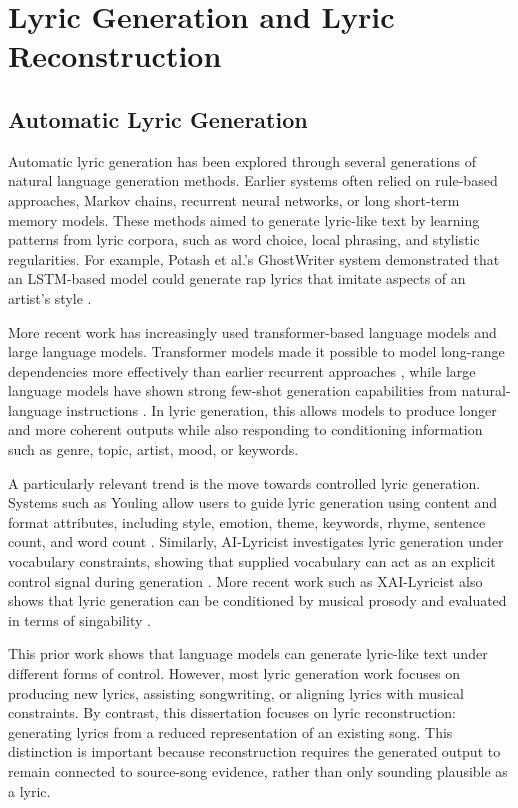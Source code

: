 \section{Lyric Generation and Lyric Reconstruction}

\subsection{Automatic Lyric Generation}

Automatic lyric generation has been explored through several generations of natural language generation methods. Earlier systems often relied on rule-based approaches, Markov chains, recurrent neural networks, or long short-term memory models. These methods aimed to generate lyric-like text by learning patterns from lyric corpora, such as word choice, local phrasing, and stylistic regularities. For example, Potash et al.'s GhostWriter system demonstrated that an LSTM-based model could generate rap lyrics that imitate aspects of an artist's style \cite{potash2015ghostwriter}.

More recent work has increasingly used transformer-based language models and large language models. Transformer models made it possible to model long-range dependencies more effectively than earlier recurrent approaches \cite{vaswani2017attention}, while large language models have shown strong few-shot generation capabilities from natural-language instructions \cite{brown2020language}. In lyric generation, this allows models to produce longer and more coherent outputs while also responding to conditioning information such as genre, topic, artist, mood, or keywords.

A particularly relevant trend is the move towards controlled lyric generation. Systems such as Youling allow users to guide lyric generation using content and format attributes, including style, emotion, theme, keywords, rhyme, sentence count, and word count \cite{zhang2020youling}. Similarly, AI-Lyricist investigates lyric generation under vocabulary constraints, showing that supplied vocabulary can act as an explicit control signal during generation \cite{ma2021ailyricist}. More recent work such as XAI-Lyricist also shows that lyric generation can be conditioned by musical prosody and evaluated in terms of singability \cite{liang2024xailyricist}.

This prior work shows that language models can generate lyric-like text under different forms of control. However, most lyric generation work focuses on producing new lyrics, assisting songwriting, or aligning lyrics with musical constraints. By contrast, this dissertation focuses on lyric reconstruction: generating lyrics from a reduced representation of an existing song. This distinction is important because reconstruction requires the generated output to remain connected to source-song evidence, rather than only sounding plausible as a lyric.

